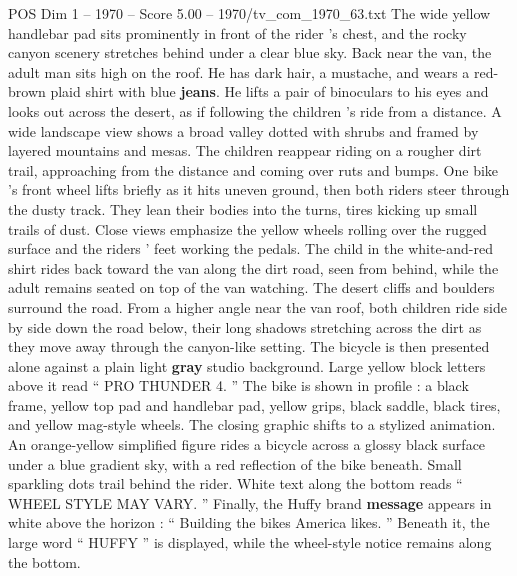 \begin{textsample}{POS Dim 1 – 1970 – Score 5.00 – 1970/tv\_com\_1970\_63.txt}
The wide yellow handlebar pad sits prominently in front of the rider ’s chest, and the rocky canyon scenery stretches behind under a clear blue sky.
Back near the van, the adult man sits high on the roof.
He has dark hair, a mustache, and wears a red-brown plaid shirt with blue \textbf{jeans}.
He lifts a pair of binoculars to his eyes and looks out across the desert, as if following the children ’s ride from a distance.
A wide landscape view shows a broad valley dotted with shrubs and framed by layered mountains and mesas.
The children reappear riding on a rougher dirt trail, approaching from the distance and coming over ruts and bumps.
One bike ’s front wheel lifts briefly as it hits uneven ground, then both riders steer through the dusty track.
They lean their bodies into the turns, tires kicking up small trails of dust.
Close views emphasize the yellow wheels rolling over the rugged surface and the riders ’ feet working the pedals.
The child in the white-and-red shirt rides back toward the van along the dirt road, seen from behind, while the adult remains seated on top of the van watching.
The desert cliffs and boulders surround the road.
From a higher angle near the van roof, both children ride side by side down the road below, their long shadows stretching across the dirt as they move away through the canyon-like setting.
The bicycle is then presented alone against a plain light \textbf{gray} studio background.
Large yellow block letters above it read “ PRO THUNDER 4. ” The bike is shown in profile : a black frame, yellow top pad and handlebar pad, yellow grips, black saddle, black tires, and yellow mag-style wheels.
The closing graphic shifts to a stylized animation.
An orange-yellow simplified figure rides a bicycle across a glossy black surface under a blue gradient sky, with a red reflection of the bike beneath.
Small sparkling dots trail behind the rider.
White text along the bottom reads “ WHEEL STYLE MAY VARY. ” Finally, the Huffy brand \textbf{message} appears in white above the horizon : “ Building the bikes America likes. ” Beneath it, the large word “ HUFFY ” is displayed, while the wheel-style notice remains along the bottom.

\end{textsample}
